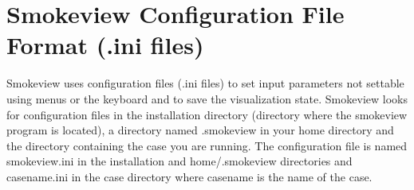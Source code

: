 \documentclass[11pt,twoside]{book}
\begin{document}
\section{Smokeview Configuration File Format (.ini files)}
\label{sectionconfig}
\label{appendixini}

Smokeview uses configuration files (.ini files) to set input parameters not
settable using menus or the keyboard and to save the visualization state.
Smokeview looks for configuration files in the installation directory
(directory where the smokeview program is located), a directory named .smokeview
in your home directory and the directory containing the case you are running.
The configuration file is named smokeview.ini in the installation
and  home/.smokeview directories and casename.ini in the case directory where casename is the name of the case.
\end{document}
